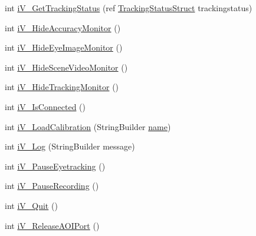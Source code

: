 \begin{DoxyCompactItemize}
\item 
int \hyperlink{class_web_analyzer_1_1_eye_tracking_1_1_eye_tracking_controller_a6ad6fbef1235a4e76ef1c8127c95554a}{i\+V\+\_\+\+Get\+Tracking\+Status} (ref \hyperlink{struct_web_analyzer_1_1_eye_tracking_1_1_eye_tracking_controller_1_1_tracking_status_struct}{Tracking\+Status\+Struct} trackingstatus)
\item 
int \hyperlink{class_web_analyzer_1_1_eye_tracking_1_1_eye_tracking_controller_a78f4ccfc968d5fe553a6807ba780f571}{i\+V\+\_\+\+Hide\+Accuracy\+Monitor} ()
\item 
int \hyperlink{class_web_analyzer_1_1_eye_tracking_1_1_eye_tracking_controller_a1fe8754d0a57152d2dcecd50d7c647fa}{i\+V\+\_\+\+Hide\+Eye\+Image\+Monitor} ()
\item 
int \hyperlink{class_web_analyzer_1_1_eye_tracking_1_1_eye_tracking_controller_ac8b487e782422c3be7d30baf14753f4a}{i\+V\+\_\+\+Hide\+Scene\+Video\+Monitor} ()
\item 
int \hyperlink{class_web_analyzer_1_1_eye_tracking_1_1_eye_tracking_controller_a0059313c908bc813dd5c20d5a95dde8a}{i\+V\+\_\+\+Hide\+Tracking\+Monitor} ()
\item 
int \hyperlink{class_web_analyzer_1_1_eye_tracking_1_1_eye_tracking_controller_a5929e7d4215d7396926176190269bf9f}{i\+V\+\_\+\+Is\+Connected} ()
\item 
int \hyperlink{class_web_analyzer_1_1_eye_tracking_1_1_eye_tracking_controller_a782cd4eba18171c1f4b5269a5d9fb78a}{i\+V\+\_\+\+Load\+Calibration} (String\+Builder \hyperlink{_u_i_2_h_t_m_l_resources_2js_2src_2create__experiment_8js_adac2bcb4f01b574cbc63fe8ee2c56bf0}{name})
\item 
int \hyperlink{class_web_analyzer_1_1_eye_tracking_1_1_eye_tracking_controller_a4d8c5ffa82586a8458808864b3d3235d}{i\+V\+\_\+\+Log} (String\+Builder message)
\item 
int \hyperlink{class_web_analyzer_1_1_eye_tracking_1_1_eye_tracking_controller_a7af23f3474e59cc2558a4aa6b8a68d59}{i\+V\+\_\+\+Pause\+Eyetracking} ()
\item 
int \hyperlink{class_web_analyzer_1_1_eye_tracking_1_1_eye_tracking_controller_a218ea5be7dca1cb6a408cafe579814fb}{i\+V\+\_\+\+Pause\+Recording} ()
\item 
int \hyperlink{class_web_analyzer_1_1_eye_tracking_1_1_eye_tracking_controller_ae383a91b94a1e9a8de106b15c2eea3f1}{i\+V\+\_\+\+Quit} ()
\item 
int \hyperlink{class_web_analyzer_1_1_eye_tracking_1_1_eye_tracking_controller_aaa4a2abd70c3da08fd08ba59d84c5216}{i\+V\+\_\+\+Release\+A\+O\+I\+Port} ()

\end{DoxyCompactItemize}
